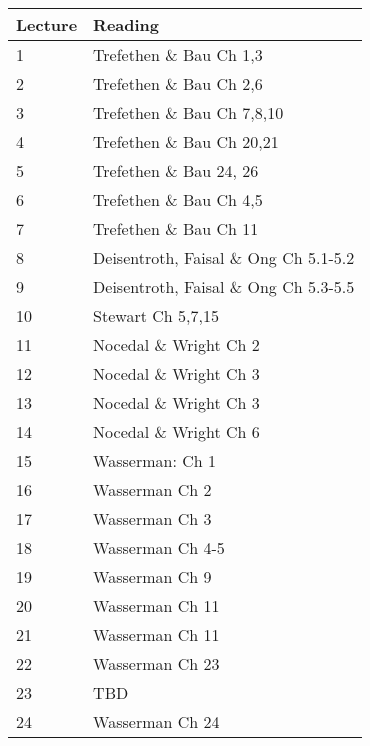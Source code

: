 \documentclass[11pt]{article}
\begin{document}
~\\
\small
\begin{centering}
\begin{tabular}{||l|p{3in}||}
\hline\hline
Lecture & Reading    \\
\hline\hline
1      &   Trefethen \& Bau Ch 1,3  \\
\hline
2     &  Trefethen \& Bau Ch 2,6  \\
\hline
3      &  Trefethen \& Bau Ch 7,8,10  \\
\hline
4 &  Trefethen \& Bau Ch 20,21 \\
\hline
5 &  Trefethen \& Bau 24, 26 \\
\hline
6 &  Trefethen \& Bau  Ch 4,5    \\
\hline 
7 & Trefethen \& Bau  Ch 11   \\
\hline 
8 & Deisentroth, Faisal \& Ong Ch 5.1-5.2   \\
\hline 
9 &   Deisentroth, Faisal \& Ong Ch 5.3-5.5  \\
\hline 
10 &  Stewart Ch 5,7,15  \\
\hline 
11 &  Nocedal \& Wright Ch 2   \\
\hline 
12 &  Nocedal \& Wright Ch 3  \\
\hline 
13 &   Nocedal \& Wright Ch 3 \\
\hline 
14 &   Nocedal \& Wright Ch 6  \\
\hline 
15 & Wasserman: Ch 1   \\
\hline 
16 &  Wasserman Ch 2  \\
\hline 
17 & Wasserman Ch 3   \\
\hline 
18 &  Wasserman Ch 4-5\\
\hline 
19 & Wasserman Ch 9 \\
\hline 
20 &    Wasserman Ch 11  \\
\hline 
21 &   Wasserman Ch 11   \\
\hline 
22 &    Wasserman Ch 23 \\
\hline 
23 &  TBD  \\
\hline 
24 &   Wasserman Ch 24 \\
\hline
\hline

\end{tabular}\\
\end{centering}
\end{document}
